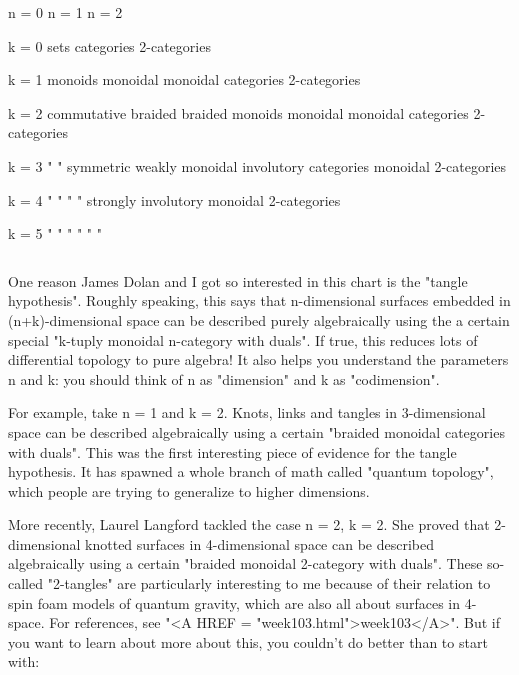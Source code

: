               n = 0           n = 1             n = 2

k = 0         sets          categories         2-categories
     

k = 1        monoids         monoidal           monoidal
                            categories        2-categories

k = 2       commutative      braided            braided
             monoids         monoidal           monoidal
                            categories        2-categories 

k = 3         " "           symmetric            weakly
                             monoidal          involutory
                            categories          monoidal
                                              2-categories

k = 4         " "             " "               strongly 
                                               involutory
                                                monoidal
                                              2-categories

k = 5         " "             " "                "  "

$$
    
One reason James Dolan and I got so interested in this chart is the
"tangle hypothesis".  Roughly speaking, this says that n-dimensional
surfaces embedded in (n+k)-dimensional space can be described purely
algebraically using the a certain special "k-tuply monoidal n-category
with duals".  If true, this reduces lots of differential
topology to pure algebra!  It also helps you understand the parameters
n and k: you should think of n as "dimension" 
and k as "codimension".

For example, take n = 1 and k = 2.  Knots, links and tangles in
3-dimensional space can be described algebraically using a certain
"braided monoidal categories with duals".  This was the first
interesting piece of evidence for the tangle hypothesis.  It has
spawned a whole branch of math called "quantum topology", which
people are trying to generalize to higher dimensions.

More recently, Laurel Langford tackled the case n = 2, k = 2.  She
proved that 2-dimensional knotted surfaces in 4-dimensional space can
be described algebraically using a certain "braided monoidal
2-category with duals".  These so-called "2-tangles" 
are particularly
interesting to me because of their relation to spin foam models of
quantum gravity, which are also all about surfaces in 4-space.  For
references, see "<A HREF = "week103.html">week103</A>".  But if you want to learn about more about
this, you couldn't do better than to start with:

